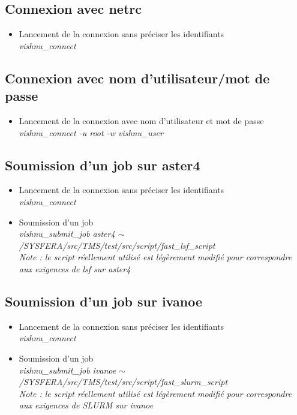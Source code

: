 \documentclass{article}
\begin{document}
\subsection{Connexion avec netrc}
\begin{itemize}
\item Lancement de la connexion sans préciser les identifiants\\
  \textit{vishnu\_connect}
\end{itemize}

\subsection{Connexion avec nom d'utilisateur/mot de passe}
\begin{itemize}
\item Lancement de la connexion avec nom d'utilisateur et mot de passe\\
  \textit{vishnu\_connect -u root -w vishnu\_user}
\end{itemize}

\subsection{Soumission d'un job sur aster4}
\begin{itemize}
\item Lancement de la connexion sans préciser les identifiants\\
  \textit{vishnu\_connect}
\item Soumission d'un job\\
  \textit{vishnu\_submit\_job aster4 $\sim$/SYSFERA/src/TMS/test/src/script/fast\_lsf\_script} \\
  \textit{Note : le script r\'eellement utilis\'e est l\'eg\`erement modifi\'e pour correspondre aux exigences de lsf sur aster4} \\
\end{itemize}

\subsection{Soumission d'un job sur ivanoe}
\begin{itemize}
\item Lancement de la connexion sans préciser les identifiants\\
  \textit{vishnu\_connect}
\item Soumission d'un job\\
  \textit{vishnu\_submit\_job ivanoe $\sim$/SYSFERA/src/TMS/test/src/script/fast\_slurm\_script}\\
  \textit{Note : le script r\'eellement utilis\'e est l\'eg\`erement modifi\'e pour correspondre aux exigences de SLURM sur ivanoe} \\
\end{itemize}
\end{document}
